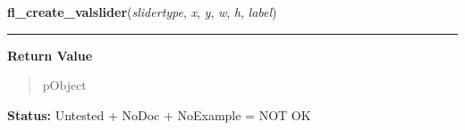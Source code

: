     \label{xformslib:library:fl_create_valslider}

    \vspace{0.5ex}

\hspace{.8\funcindent}\begin{boxedminipage}{\funcwidth}

    \raggedright \textbf{fl\_create\_valslider}(\textit{slidertype}, \textit{x}, \textit{y}, \textit{w}, \textit{h}, \textit{label})

    \vspace{-1.5ex}

    \rule{\textwidth}{0.5\fboxrule}
\setlength{\parskip}{2ex}
\setlength{\parskip}{1ex}
      \textbf{Return Value}
    \vspace{-1ex}

      \begin{quote}
      pObject

      \end{quote}

\textbf{Status:} Untested + NoDoc + NoExample = NOT OK



    \end{boxedminipage}

    \label{xformslib:library:fl_add_valslider}

    \vspace{0.5ex}


